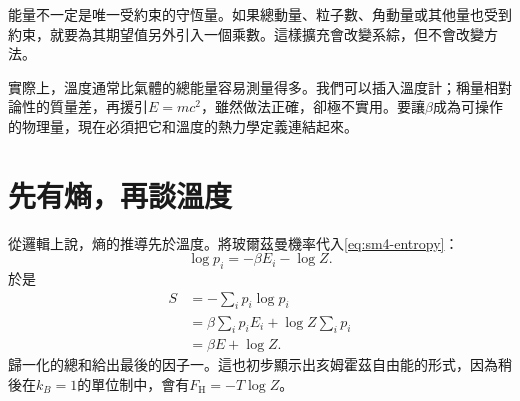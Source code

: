 \begin{classroomqa}
\end{classroomqa}

能量不一定是唯一受約束的守恆量。如果總動量、粒子數、角動量或其他量也受到約束，就要為其期望值另外引入一個乘數。這樣擴充會改變系綜，但不會改變方法。

\begin{classroomqa}
\end{classroomqa}

\begin{classroomqa}
\end{classroomqa}

\begin{classroomqa}
\end{classroomqa}

實際上，溫度通常比氣體的總能量容易測量得多。我們可以插入溫度計；稱量相對論性的質量差，再援引\(E=mc^2\)，雖然做法正確，卻極不實用。要讓\(\beta\)成為可操作的物理量，現在必須把它和溫度的熱力學定義連結起來。

\section{先有熵，再談溫度}

從邏輯上說，熵的推導先於溫度。將玻爾茲曼機率代入\eqref{eq:sm4-entropy}：
\begin{equation}
 \log p_i=-\beta E_i-\log Z.
\end{equation}
於是
\begin{align}
 S
 &=-\sum_i p_i\log p_i\\
 &=\beta\sum_i p_iE_i+\log Z\sum_i p_i\\
 &=\beta E+\log Z.
 \label{eq:sm4-entropy-logz}
\end{align}
歸一化的總和給出最後的因子一。這也初步顯示出亥姆霍茲自由能的形式，因為稍後在\(k_B=1\)的單位制中，會有\(F_{\mathrm H}=-T\log Z\)。

